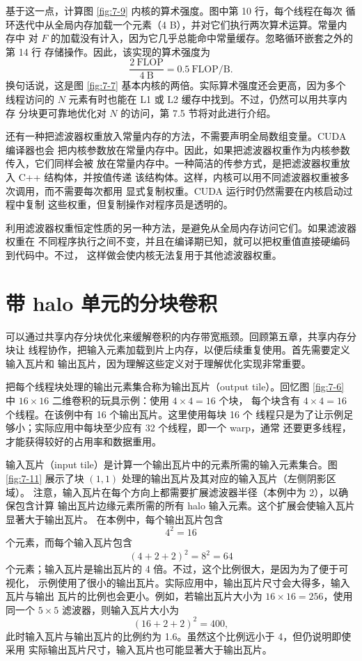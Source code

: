 基于这一点，计算图 \ref{fig:7-9} 内核的算术强度。图中第 10 行，每个线程在每次
循环迭代中从全局内存加载一个元素（4 B），并对它们执行两次算术运算。常量内存中
对 $F$ 的加载没有计入，因为它几乎总能命中常量缓存。忽略循环嵌套之外的第 14 行
存储操作。因此，该实现的算术强度为
\[
  \frac{2\ \mathrm{FLOP}}{4\ \mathrm{B}}
  =0.5\ \mathrm{FLOP/B}.
\]
换句话说，这是图 \ref{fig:7-7} 基本内核的两倍。实际算术强度还会更高，因为多个
线程访问的 $N$ 元素有时也能在 L1 或 L2 缓存中找到。不过，仍然可以用共享内存
分块更可靠地优化对 $N$ 的访问，第 7.5 节将对此进行介绍。

还有一种把滤波器权重放入常量内存的方法，不需要声明全局数组变量。CUDA 编译器也会
把内核参数放在常量内存中。因此，如果把滤波器权重作为内核参数传入，它们同样会被
放在常量内存中。一种简洁的传参方式，是把滤波器权重放入 C++ 结构体，并按值传递
该结构体。这样，内核可以用不同滤波器权重被多次调用，而不需要每次都用
 显式复制权重。CUDA 运行时仍然需要在内核启动过程中复制
这些权重，但复制操作对程序员是透明的。

利用滤波器权重恒定性质的另一种方法，是避免从全局内存访问它们。如果滤波器权重在
不同程序执行之间不变，并且在编译期已知，就可以把权重值直接硬编码到代码中。不过，
这样做会使内核无法复用于其他滤波器权重。

\section{带 halo 单元的分块卷积}
\label{sec:tiled-convolution-halo}

可以通过共享内存分块优化来缓解卷积的内存带宽瓶颈。回顾第五章，共享内存分块让
线程协作，把输入元素加载到片上内存，以便后续重复使用。首先需要定义输入瓦片和
输出瓦片，因为理解这些定义对于理解优化实现非常重要。

把每个线程块处理的输出元素集合称为输出瓦片（output tile）。回忆图
\ref{fig:7-6} 中 $16\times16$ 二维卷积的玩具示例：使用 $4\times4=16$ 个块，
每个块含有 $4\times4=16$ 个线程。在该例中有 16 个输出瓦片。这里使用每块 16 个
线程只是为了让示例足够小；实际应用中每块至少应有 32 个线程，即一个 warp，通常
还要更多线程，才能获得较好的占用率和数据重用。

输入瓦片（input tile）是计算一个输出瓦片中的元素所需的输入元素集合。图
\ref{fig:7-11} 展示了块 $(1,1)$ 处理的输出瓦片及其对应的输入瓦片（左侧阴影区域）。
注意，输入瓦片在每个方向上都需要扩展滤波器半径（本例中为 2），以确保包含计算
输出瓦片边缘元素所需的所有 halo 输入元素。这个扩展会使输入瓦片显著大于输出瓦片。
在本例中，每个输出瓦片包含
\[
  4^2=16
\]
个元素，而每个输入瓦片包含
\[
  (4+2+2)^2=8^2=64
\]
个元素；输入瓦片是输出瓦片的 4 倍。不过，这个比例很大，是因为为了便于可视化，
示例使用了很小的输出瓦片。实际应用中，输出瓦片尺寸会大得多，输入瓦片与输出
瓦片的比例也会更小。例如，若输出瓦片大小为 $16\times16=256$，使用同一个
$5\times5$ 滤波器，则输入瓦片大小为
\[
  (16+2+2)^2=400,
\]
此时输入瓦片与输出瓦片的比例约为 1.6。虽然这个比例远小于 4，但仍说明即使采用
实际输出瓦片尺寸，输入瓦片也可能显著大于输出瓦片。


